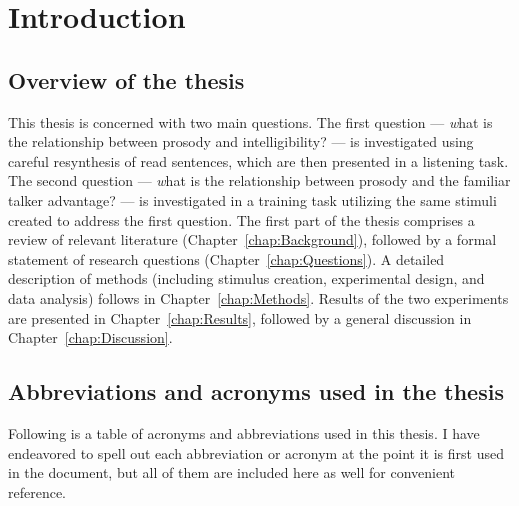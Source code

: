 \chapter{Introduction}
\section[Overview]{Overview of the thesis \label{sec:Overview}}
This thesis is concerned with two main questions.  The first question — {\emph what is the relationship between prosody and intelligibility?} — is investigated using careful resynthesis of read sentences, which are then presented in a listening task.  The second question — {\emph what is the relationship between prosody and the familiar talker advantage?} — is investigated in a training task utilizing the same stimuli created to address the first question.  The first part of the thesis comprises a review of relevant literature (Chapter~\ref{chap:Background}), followed by a formal statement of research questions (Chapter~\ref{chap:Questions}).  A detailed description of methods (including stimulus creation, experimental design, and data analysis) follows in Chapter~\ref{chap:Methods}.  Results of the two experiments are presented in Chapter~\ref{chap:Results}, followed by a general discussion in Chapter~\ref{chap:Discussion}.

\section[Abbreviations \& acronyms]{Abbreviations and acronyms used in the thesis \label{sec:Abbr}}
Following is a table of acronyms and abbreviations used in this thesis.  I have endeavored to spell out each abbreviation or acronym at the point it is first used in the document, but all of them are included here as well for convenient reference.


